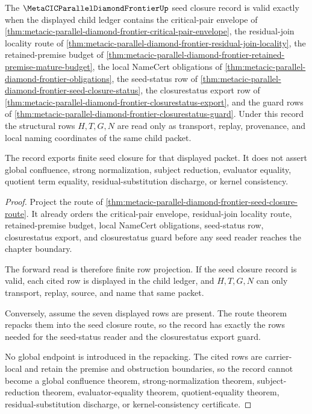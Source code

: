 \begin{theorem}
\label{thm:metacic-parallel-diamond-frontier-seed-closure-record}
The $\MetaCICParallelDiamondFrontierUp$ seed closure record is valid exactly when the displayed child ledger contains the critical-pair envelope of \autoref{thm:metacic-parallel-diamond-frontier-critical-pair-envelope}, the residual-join locality route of \autoref{thm:metacic-parallel-diamond-frontier-residual-join-locality}, the retained-premise budget of \autoref{thm:metacic-parallel-diamond-frontier-retained-premise-mature-budget}, the local NameCert obligations of \autoref{thm:metacic-parallel-diamond-frontier-obligations}, the seed-status row of \autoref{thm:metacic-parallel-diamond-frontier-seed-closure-status}, the closurestatus export row of \autoref{thm:metacic-parallel-diamond-frontier-closurestatus-export}, and the guard rows of \autoref{thm:metacic-parallel-diamond-frontier-closurestatus-guard}. Under this record the structural rows $H,T,G,N$ are read only as transport, replay, provenance, and local naming coordinates of the same child packet.

The record exports finite seed closure for that displayed packet. It does not assert global confluence, strong normalization, subject reduction, evaluator equality, quotient term equality, residual-substitution discharge, or kernel consistency.
\end{theorem}
\begin{proof}
Project the route of \autoref{thm:metacic-parallel-diamond-frontier-seed-closure-route}. It already orders the critical-pair envelope, residual-join locality route, retained-premise budget, local NameCert obligations, seed-status row, closurestatus export, and closurestatus guard before any seed reader reaches the chapter boundary.

The forward read is therefore finite row projection. If the seed closure record is valid, each cited row is displayed in the child ledger, and $H,T,G,N$ can only transport, replay, source, and name that same packet.

Conversely, assume the seven displayed rows are present. The route theorem repacks them into the seed closure route, so the record has exactly the rows needed for the seed-status reader and the closurestatus export guard.

No global endpoint is introduced in the repacking. The cited rows are carrier-local and retain the premise and obstruction boundaries, so the record cannot become a global confluence theorem, strong-normalization theorem, subject-reduction theorem, evaluator-equality theorem, quotient-equality theorem, residual-substitution discharge, or kernel-consistency certificate.
\end{proof}
